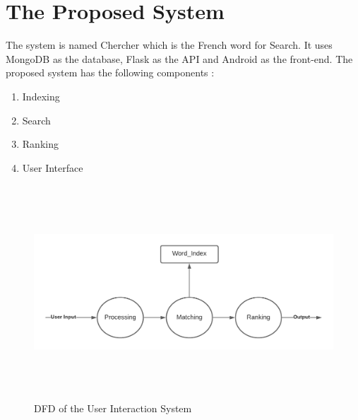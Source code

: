 \documentclass[12pt]{article}
\begin{document}
	\pagebreak
	
	\section{The Proposed System}
	
	The system is named Chercher which is the French word for Search. It uses MongoDB as the database, Flask as the API and Android as the front-end. The proposed system has the following components :
	\begin{enumerate}
		\item Indexing
		\item Search
		\item Ranking
		\item User Interface
	\end{enumerate}
	\begin{figure}[H]
		\includegraphics[width=15cm, height=8cm]{System_DFD}
		\caption{DFD of the User Interaction System}
	\end{figure}
\end{document}
